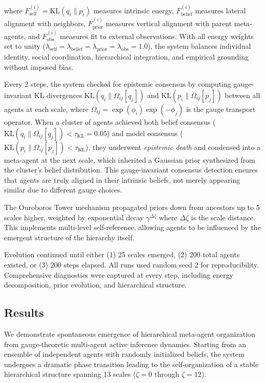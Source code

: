 \documentclass[11pt]{article}
\begin{document}
where $F_{\text{self}}^{(i)} = \text{KL}(q_i \| p_i)$ measures intrinsic energy, $F_{\text{belief}}^{(i)}$ measures lateral alignment with neighbors, $F_{\text{prior}}^{(i)}$ measures vertical alignment with parent meta-agents, and $F_{\text{obs}}^{(i)}$ measures fit to external observations. With all energy weights set to unity ($\lambda_{\text{self}} = \lambda_{\text{belief}} = \lambda_{\text{prior}} = \lambda_{\text{obs}} = 1.0$), the system balances individual identity, social coordination, hierarchical integration, and empirical grounding without imposed bias.

Every 2 steps, the system checked for epistemic consensus by computing gauge-invariant KL divergences $\text{KL}(q_i \| \Omega_{ij}[q_j])$ and $\text{KL}(p_i \| \Omega_{ij}[p_j])$ between all agents at each scale, where $\Omega_{ij} = \exp(\phi_i) \exp(-\phi_j)$ is the gauge transport operator. When a cluster of agents achieved both belief consensus ($\text{KL}(q_i \| \Omega_{ij}[q_j]) < \tau_{\text{KL}} = 0.05$) and model consensus ($\text{KL}(p_i \| \Omega_{ij}[p_j]) < \tau_{\text{KL}}$), they underwent \textit{epistemic death} and condensed into a meta-agent at the next scale, which inherited a Gaussian prior synthesized from the cluster's belief distribution. This gauge-invariant consensus detection ensures that agents are truly aligned in their intrinsic beliefs, not merely appearing similar due to different gauge choices.

The Ouroboros Tower mechanism propagated priors down from ancestors up to 5 scales higher, weighted by exponential decay $\gamma^{\Delta\zeta}$ where $\Delta\zeta$ is the scale distance. This implements multi-level self-reference, allowing agents to be influenced by the emergent structure of the hierarchy itself.

Evolution continued until either (1) 25 scales emerged, (2) 200 total agents existed, or (3) 200 steps elapsed. All runs used random seed 2 for reproducibility. Comprehensive diagnostics were captured at every step, including energy decomposition, prior evolution, and hierarchical structure.



\subsection{Results}

We demonstrate spontaneous emergence of hierarchical meta-agent organization from gauge-theoretic multi-agent active inference dynamics. Starting from an ensemble of independent agents with randomly initialized beliefs, the system undergoes a dramatic phase transition leading to the self-organization of a stable hierarchical structure spanning 13 scales ($\zeta = 0$ through $\zeta = 12$).
\end{document}
